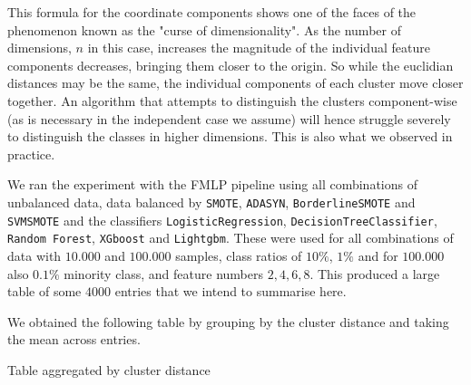 This formula for the coordinate components shows one of the faces of the phenomenon known as the "curse of dimensionality".
As the number of dimensions, $n$ in this case, increases the magnitude of the individual feature components decreases, bringing them closer to the origin.
So while the euclidian distances may be the same, the individual components of each cluster move closer together.
An algorithm that attempts to distinguish the clusters component-wise (as is necessary in the independent case we assume) will hence struggle severely to
distinguish the classes in higher dimensions. This is also what we observed in practice.

We ran the experiment with the FMLP pipeline using all combinations of unbalanced data, data balanced by \texttt{SMOTE}, \texttt{ADASYN}, \texttt{BorderlineSMOTE} and 
\texttt{SVMSMOTE} and the classifiers \texttt{LogisticRegression}, \texttt{DecisionTreeClassifier}, \texttt{Random Forest}, \texttt{XGboost} and \texttt{Lightgbm}.
These were used for all combinations of data with $10.000$ and $100.000$ samples, class ratios of $10\%$, $1\%$ and for $100.000$ also $0.1\%$ minority class,
and feature numbers $2,4,6,8$.
This produced a large table of some $4000$ entries that we intend to summarise here.

We obtained the following table by grouping by the cluster distance and taking the mean across entries.
\begin{table}[H]
\centering
\caption{Table aggregated by cluster distance}
\end{table}


